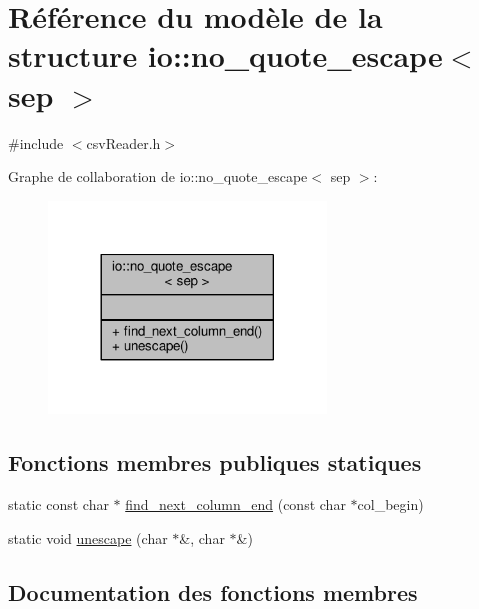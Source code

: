 \hypertarget{structio_1_1no__quote__escape}{}\section{Référence du modèle de la structure io\+:\+:no\+\_\+quote\+\_\+escape$<$ sep $>$}
\label{structio_1_1no__quote__escape}


{\ttfamily \#include $<$csv\+Reader.\+h$>$}



Graphe de collaboration de io\+:\+:no\+\_\+quote\+\_\+escape$<$ sep $>$\+:\nopagebreak
\begin{figure}[H]
\begin{center}
\leavevmode
\includegraphics[width=209pt]{structio_1_1no__quote__escape__coll__graph}
\end{center}
\end{figure}
\subsection*{Fonctions membres publiques statiques}
\begin{DoxyCompactItemize}
\item 
static const char $\ast$ \hyperlink{structio_1_1no__quote__escape_add17b043bb89445079a0448026ce86d0}{find\+\_\+next\+\_\+column\+\_\+end} (const char $\ast$col\+\_\+begin)
\item 
static void \hyperlink{structio_1_1no__quote__escape_af1c217f2c995d178a91c58235191b052}{unescape} (char $\ast$\&, char $\ast$\&)
\end{DoxyCompactItemize}


\subsection{Documentation des fonctions membres}
\mbox{\label{structio_1_1no__quote__escape_add17b043bb89445079a0448026ce86d0}} 
